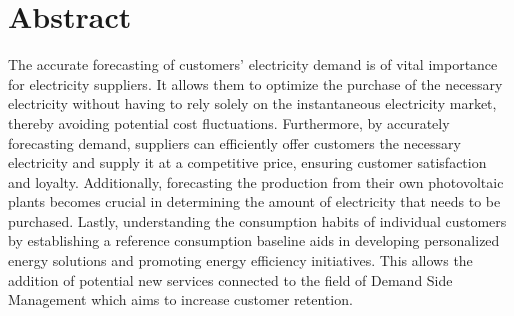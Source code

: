 \chapter*{Abstract} %
\label{abtract}

\vspace{0.4 cm}


The accurate forecasting of customers’ electricity demand is of vital importance for electricity suppliers.
It allows them to optimize the purchase of the necessary electricity without having to rely solely on the instantaneous electricity market, thereby avoiding potential cost fluctuations.
Furthermore, by accurately forecasting demand, suppliers can efficiently offer customers the necessary electricity and supply it at a competitive price, ensuring customer satisfaction and loyalty.
Additionally, forecasting the production from their own photovoltaic plants becomes crucial in determining the amount of electricity that needs to be purchased.
Lastly, understanding the consumption habits of individual customers by establishing a reference consumption baseline aids in developing personalized energy solutions and promoting energy efficiency initiatives.
This allows the addition of potential new services connected to the field of Demand Side Management which aims to increase customer retention.

